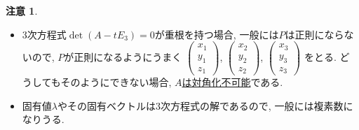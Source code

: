 \documentclass[dvipdfmx,a4paper,11pt]{article}
\theoremstyle{definition}
\newtheorem{rem}[thm]{注意}
\begin{document}
 \begin{rem}
 \text{}
 \begin{itemize}
 \setlength{\parskip}{0cm}
  	\setlength{\itemsep}{0pt} 
\item 3次方程式$\det (A - tE_3) =0$が重根を持つ場合, 一般には$P$は正則にならないので, $P$が正則になるようにうまく $ \begin{pmatrix}
x_1\\  y_1\\ z_1
 \end{pmatrix}  
 $,  $ \begin{pmatrix}
x_2\\  y_2\\ z_2
 \end{pmatrix}  
 $,  $ \begin{pmatrix}
x_3\\  y_3\\ z_3
 \end{pmatrix}  
 $
 をとる. どうしてもそのようにできない場合, \underline{$A$は対角化不可能}である. 
 \item 固有値$\lambda$やその固有ベクトルは3次方程式の解であるので, 一般には複素数になりうる. 
 \end{itemize}
 \end{rem}
\end{document}

